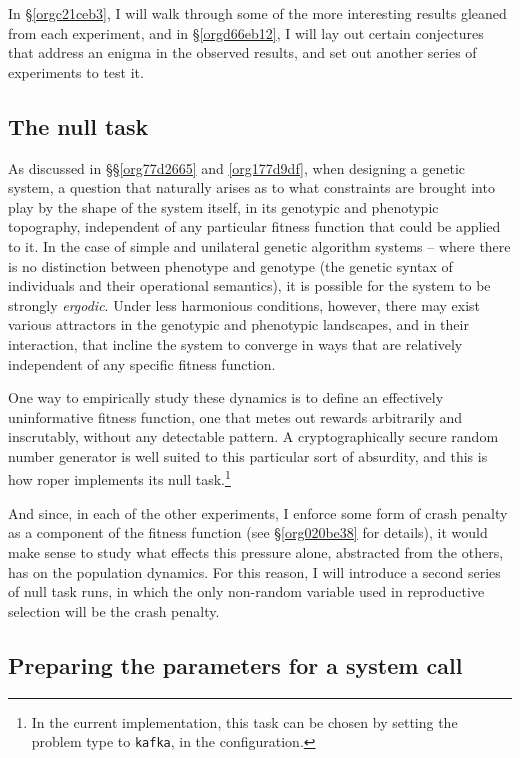 \documentclass[12pt,glossary]{dalthesis}
\begin{document}
In \S \ref{orgc21ceb3}, I will walk through some of the more interesting results
gleaned from each experiment, and in \S \ref{orgd66eb12}, I will lay out certain
conjectures that address an enigma in the observed results, and set out another
series of experiments to test it. 

\subsection{The null task}
\label{sec:orgd78966d}
\label{orgefba068}

As discussed in \S\S \ref{org77d2665} and \ref{org177d9df}, when designing a genetic
system, a question that naturally arises as to what constraints are brought into
play by the shape of the system itself, in its genotypic and phenotypic topography,
independent of any particular fitness function that could be applied to it. In the
case of simple and unilateral genetic algorithm systems -- where there is no distinction
between phenotype and genotype (the genetic syntax of individuals and their 
operational semantics), it is possible for the system to be strongly \emph{ergodic}.
Under less harmonious conditions, however, there may exist various attractors in
the genotypic and phenotypic landscapes, and in their interaction, that incline
the system to converge in ways that are relatively independent of any specific
fitness function. 

One way to empirically study these dynamics is to define an
effectively uninformative fitness function, one that metes out rewards arbitrarily
and inscrutably, without any detectable pattern. A cryptographically secure
random number generator is well suited to this particular sort of absurdity, and
this is how \gls{roper} implements its null task.\footnote{In the current implementation, this task can be chosen by setting the 
  problem type to \texttt{kafka}, in the configuration.} 

And since, in each of the other experiments, I enforce some form of crash penalty
as a component of the fitness function (see \S \ref{org020be38} for details),
it would make sense to study what effects this pressure alone, abstracted from
the others, has on the population dynamics. For this reason, I will introduce
a second series of null task runs, in which the only non-random variable used
in reproductive selection will be the crash penalty. 

\subsection{Preparing the parameters for a system call}
\label{sec:orga1a17c4}
\label{orgbf91329}
\end{document}
